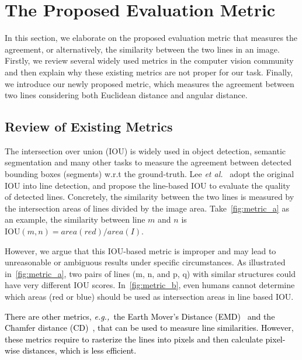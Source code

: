 \documentclass[10pt,journal,cspaper,compsoc]{IEEEtran}
\newcommand{\rerevise}[1]{{\textcolor{black}{#1}}}
\def\etal{\emph{et al.~}}
\def\eg{\emph{e.g.,~}}
\begin{document}
\section{The Proposed Evaluation Metric} 
\label{sec:metric}

In this section, we elaborate on the 
proposed evaluation metric that measures the agreement, or alternatively, 
the similarity between the two lines in an image.
%
Firstly, we review several widely used metrics in the computer vision community 
and then explain why these existing metrics are not proper for our task.
%
Finally, we introduce our newly proposed metric, which measures the agreement between two lines considering
both Euclidean distance and angular distance.
%


\subsection{Review of Existing Metrics}
The intersection over union (IOU) is widely used in object detection, semantic segmentation
and many other tasks to measure the agreement between detected bounding boxes
(segments) w.r.t the ground-truth.
%
Lee \etal \cite{lee2017semantic} adopt the original IOU into line detection,
and propose the line-based IOU to evaluate the quality of detected lines.
%
Concretely, the similarity between the two lines is measured by the intersection areas
of lines divided by the image area.
%
Take~\cref{fig:metric_a} as an example, the similarity between line $m$ and $n$
is $\text{IOU}(m,n) = area({{red}})/area(I)$.

However, we argue that this IOU-based metric is improper  and may lead to unreasonable
or ambiguous results under specific circumstances.
%
As illustrated in~\cref{fig:metric_a}, 
two pairs of lines (m, n, and p, q) with similar structures could have
very different IOU scores.
%
In~\cref{fig:metric_b}, even humans cannot determine which areas
({red} or {blue}) should be used as
intersection areas in line based IOU.

\rerevise{There are other metrics,
\eg the Earth Mover's Distance (EMD)~\cite{rubner2000earth}
and the Chamfer distance (CD)~\cite{borgefors1986distance},
that can be used to measure line similarities.
%
However, these metrics require to rasterize the lines into pixels
and then calculate pixel-wise distances, which is less efficient.
}
\end{document}
